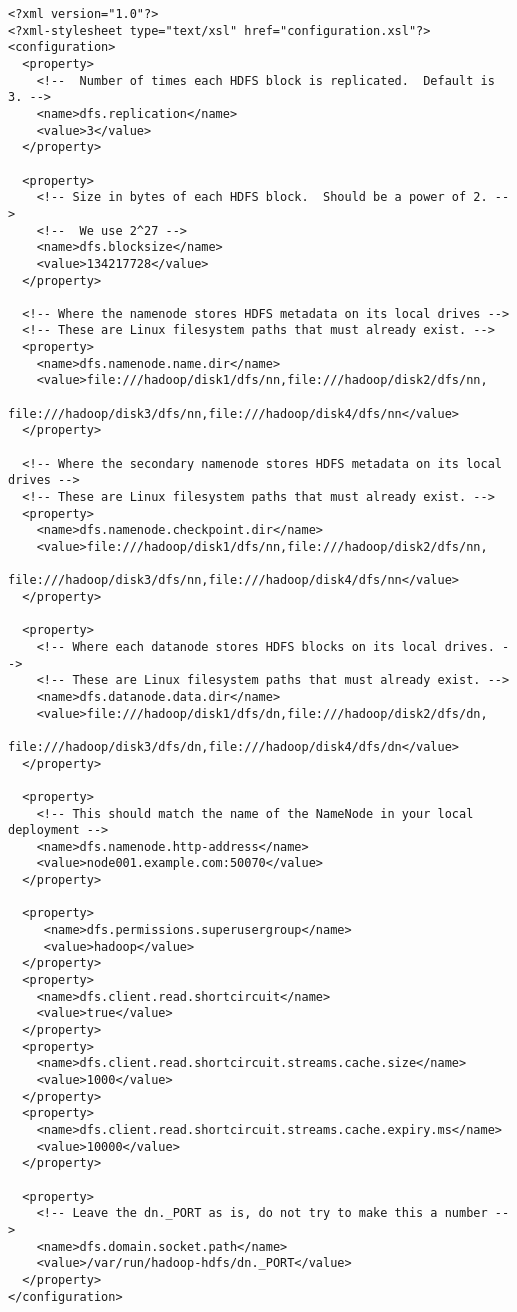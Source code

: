 \begin{verbatim}
<?xml version="1.0"?>
<?xml-stylesheet type="text/xsl" href="configuration.xsl"?>
<configuration>
  <property>
    <!--  Number of times each HDFS block is replicated.  Default is 3. -->
    <name>dfs.replication</name>
    <value>3</value>
  </property>

  <property>
    <!-- Size in bytes of each HDFS block.  Should be a power of 2. -->
    <!--  We use 2^27 -->
    <name>dfs.blocksize</name>
    <value>134217728</value>
  </property>

  <!-- Where the namenode stores HDFS metadata on its local drives -->
  <!-- These are Linux filesystem paths that must already exist. -->
  <property>
    <name>dfs.namenode.name.dir</name>
    <value>file:///hadoop/disk1/dfs/nn,file:///hadoop/disk2/dfs/nn,
           file:///hadoop/disk3/dfs/nn,file:///hadoop/disk4/dfs/nn</value>
  </property>

  <!-- Where the secondary namenode stores HDFS metadata on its local drives -->
  <!-- These are Linux filesystem paths that must already exist. -->
  <property>
    <name>dfs.namenode.checkpoint.dir</name>
    <value>file:///hadoop/disk1/dfs/nn,file:///hadoop/disk2/dfs/nn,
           file:///hadoop/disk3/dfs/nn,file:///hadoop/disk4/dfs/nn</value>
  </property>

  <property>
    <!-- Where each datanode stores HDFS blocks on its local drives. -->
    <!-- These are Linux filesystem paths that must already exist. -->
    <name>dfs.datanode.data.dir</name>
    <value>file:///hadoop/disk1/dfs/dn,file:///hadoop/disk2/dfs/dn,
           file:///hadoop/disk3/dfs/dn,file:///hadoop/disk4/dfs/dn</value>
  </property>

  <property>
    <!-- This should match the name of the NameNode in your local deployment -->
    <name>dfs.namenode.http-address</name>
    <value>node001.example.com:50070</value>
  </property>

  <property>
     <name>dfs.permissions.superusergroup</name>
     <value>hadoop</value>
  </property>
  <property>
    <name>dfs.client.read.shortcircuit</name>
    <value>true</value>
  </property>
  <property>
    <name>dfs.client.read.shortcircuit.streams.cache.size</name>
    <value>1000</value>
  </property>
  <property>
    <name>dfs.client.read.shortcircuit.streams.cache.expiry.ms</name>
    <value>10000</value>
  </property>

  <property>
    <!-- Leave the dn._PORT as is, do not try to make this a number -->
    <name>dfs.domain.socket.path</name>
    <value>/var/run/hadoop-hdfs/dn._PORT</value>
  </property>
</configuration>
\end{verbatim}


